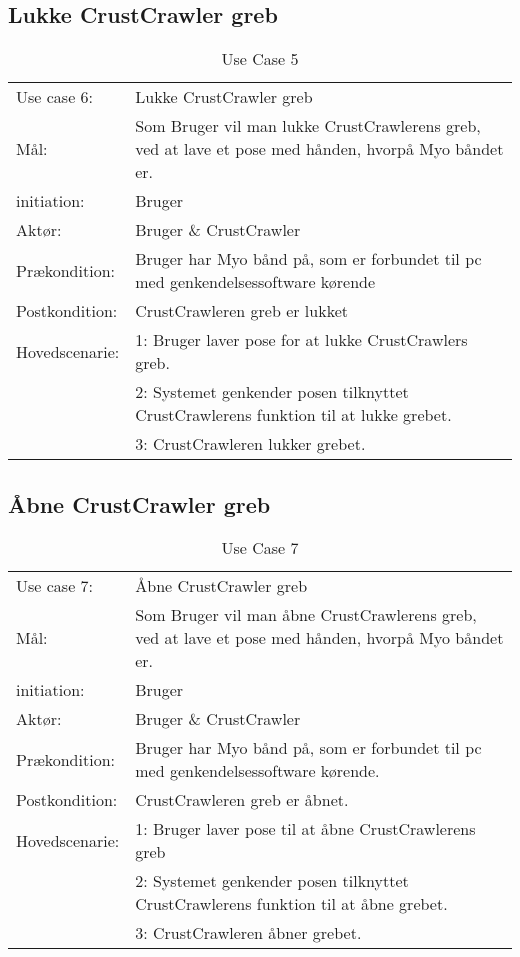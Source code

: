 \subsection{Lukke CrustCrawler greb}
\begin{center}
	\begin{table}[htbp]
		\begin{tabular}{lp{10cm}}
			\rowcolor{grey} Use case 6:		& Lukke CrustCrawler greb \\
			Mål: & Som Bruger vil man lukke CrustCrawlerens greb, ved at lave et pose  med hånden, hvorpå Myo båndet er. \\
			initiation:	& Bruger\\
			Aktør: & Bruger \& CrustCrawler\\
			Prækondition: & Bruger har Myo bånd på, som er forbundet til pc med genkendelsessoftware kørende \\
			Postkondition: & CrustCrawleren greb er lukket \\
			Hovedscenarie: & 1: Bruger laver pose for at lukke CrustCrawlers greb. \\
			& 2: Systemet genkender posen tilknyttet CrustCrawlerens funktion til at lukke grebet.\\
			& 3: CrustCrawleren lukker grebet.\\

		\end{tabular}
		\caption{Use Case 5}
	\end{table}
\end{center}

\subsection{Åbne CrustCrawler greb}
\begin{center}
	\begin{table}[htbp]
		\begin{tabular}{lp{10cm}}
			\rowcolor{grey} Use case 7:		& Åbne CrustCrawler greb\\
			Mål: & Som Bruger vil man åbne CrustCrawlerens greb, ved at lave et pose  med hånden, hvorpå Myo båndet er.\\
			initiation:	& Bruger \\
			Aktør: & Bruger \& CrustCrawler\\
			Prækondition: & Bruger har Myo bånd på, som er forbundet til pc med genkendelsessoftware kørende. \\
			Postkondition: & CrustCrawleren greb er åbnet. \\
			Hovedscenarie: & 1: Bruger laver pose til at åbne CrustCrawlerens greb\\
			& 2: Systemet genkender posen tilknyttet CrustCrawlerens funktion til at åbne grebet.\\
			& 3: CrustCrawleren åbner grebet.\\
		\end{tabular}
		\caption{Use Case 7}
	\end{table}
\end{center}

\egroup